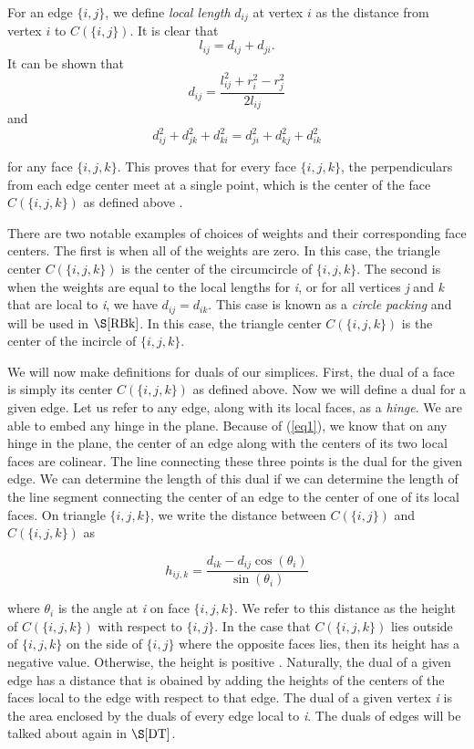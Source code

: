 \documentclass[12pt]{article}
\begin{document}
 For an edge $\{i, j\}$, we define \textit{local length} $d_{ij}$ at vertex $i$ as the distance from vertex $i$ to $C(\{i, j\})$. It is clear that
$$l_{ij} = d_{ij} + d_{ji}.$$
 It can be shown that
\begin{equation}
d_{ij} = \frac{l_{ij}^2 + r_i^2 - r_j^2}{2l_{ij}}
\label{eq2}
\end{equation}
and
\begin{equation}
\label{eq1}
d_{ij}^2 + d_{jk}^2 + d_{ki}^2 = d_{ji}^2 + d_{kj}^2 + d_{ik}^2
\end{equation}

 for any face $\{i, j, k\}$. This proves that for every face $\{i, j, k\}$, the perpendiculars from each edge center meet at a single point, which is the center of the face $C(\{i, j, k\})$ as defined above \cite{Dave}.

 There are two notable examples of choices of weights and their corresponding face centers. The first is when all of the weights are zero. In this case, the triangle center $C(\{i, j, k\})$ is the center of the circumcircle of $\{i, j, k\}$. The second is when the weights are equal to the local lengths for \textit{i}, or for all vertices \textit{j} and \textit{k} that are local to \textit{i}, we have $d_{ij} = d_{ik}$. This case is known as a \textit{circle packing} and will be used in $\S\ref{RBk}$. In this case, the triangle center $C(\{i, j, k\})$ is the center of the incircle of $\{i, j, k\}$.

 We will now make definitions for duals of our simplices. First, the dual of a face is simply its center $C(\{i, j, k\})$ as defined above. Now we will define a dual for a given edge. Let us refer to any edge, along with its local faces, as a \textit{hinge}. We are able to embed any hinge in the plane. Because of (\ref{eq1}), we know that on any hinge in the plane, the center of an edge along with the centers of its two local faces are colinear. The line connecting these three points is the dual for the given edge. We can determine the length of this dual if we can determine the length of the line segment connecting the center of an edge to the center of one of its local faces. On triangle $\{i, j, k\}$, we write the distance between $C(\{i, j\})$ and $C(\{i, j, k\})$ as 

\begin{equation}
\label{eq3}
h_{ij,k} = \frac{d_{ik} - d_{ij}\cos(\theta_i)}{\sin(\theta_i)}
\end{equation}

 where $\theta_i$ is the angle at \textit{i} on face $\{i, j, k\}$. We refer to this distance as the height of $C(\{i, j, k\})$ with respect to $\{i, j\}$. In the case that $C(\{i, j, k\})$ lies outside of $\{i, j, k\}$ on the side of $\{i, j\}$ where the opposite faces lies, then its height has a negative value. Otherwise, the height is positive \cite{Dave}. Naturally, the dual of a given edge has a distance that is obained by adding the heights of the centers of the faces local to the edge with respect to that edge. The dual of a given vertex \textit{i} is the area enclosed by the duals of every edge local to \textit{i}. The duals of edges will be talked about again in $\S\ref{DT}$.
\end{document}
